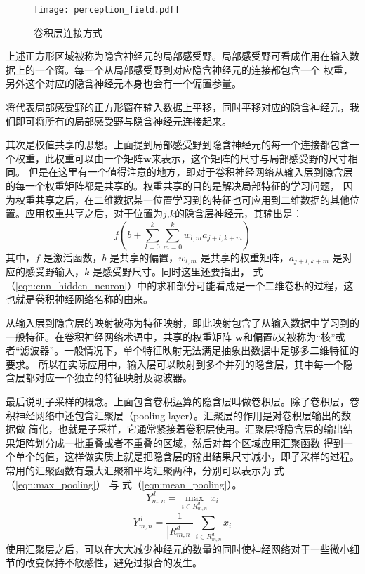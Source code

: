 \begin{figure}[htbp]
	\texttt{[image: perception\_field.pdf]}
	\caption{卷积层连接方式}
	\label{perception_filed}
\end{figure}
上述正方形区域被称为隐含神经元的局部感受野。局部感受野可看成作用在输入数据上的一个窗。每一个从局部感受野到对应隐含神经元的连接都包含一个
权重，另外这个对应的隐含神经元本身也会有一个偏置参量。

将代表局部感受野的正方形窗在输入数据上平移，同时平移对应的隐含神经元，我们即可将所有的局部感受野与隐含神经元连接起来。

其次是权值共享的思想。上面提到局部感受野到隐含神经元的每一个连接都包含一个权重，此权重可以由一个矩阵$\mathbf{w}$来表示，这个矩阵的尺寸与局部感受野的尺寸相同。
但是在这里有一个值得注意的地方，即对于卷积神经网络从输入层到隐含层的每一个权重矩阵都是共享的。权重共享的目的是解决局部特征的学习问题，
因为权重共享之后，在二维数据某一位置学习到的特征也可应用到二维数据的其他位置。应用权重共享之后，对于位置为$j$,$k$的隐含层神经元，其输出是：
\begin{equation} 
\label{eqn:cnn_hidden_neuron}
f\left(b+\sum_{l=0}^{k} \sum_{m=0}^{k} w_{l, m} a_{j+l, k+m}\right)
\end{equation}
其中，$f$ 是激活函数，$b$ 是共享的偏置，$w_{l,m}$ 是共享的权重矩阵，$a_{j+l,k+m}$ 是对应的感受野输入，$k$ 是感受野尺寸。同时这里还要指出，
式（\ref{eqn:cnn_hidden_neuron}）中的求和部分可能看成是一个二维卷积的过程，这也就是卷积神经网络名称的由来。

从输入层到隐含层的映射被称为特征映射，即此映射包含了从输入数据中学习到的一般特征。在卷积神经网络术语中，共享的权重矩阵
$\mathbf{w}$和偏置$b$又被称为“核”或者“滤波器”。一般情况下，单个特征映射无法满足抽象出数据中足够多二维特征的要求。
所以在实际应用中，输入层可以映射到多个并列的隐含层，其中每一个隐含层都对应一个独立的特征映射及滤波器。

最后说明子采样的概念。上面包含卷积运算的隐含层叫做卷积层。除了卷积层，卷积神经网络中还包含汇聚层（pooling layer）。汇聚层的作用是对卷积层输出的数据做
简化，也就是子采样，它通常紧接着卷积层使用。汇聚层将隐含层的输出结果矩阵划分成一批重叠或者不重叠的区域，然后对每个区域应用汇聚函数
得到一个单个的值，这样做实质上就是把隐含层的输出结果尺寸减小，即子采样的过程。常用的汇聚函数有最大汇聚和平均汇聚两种，分别可以表示为
式（\ref{eqn:max_pooling}） 与 式（\ref{eqn:mean_pooling}）。
\begin{equation}
\label{eqn:max_pooling} 
Y_{m, n}^{d}=\max _{i \in R_{m, n}^{d}} x_{i}
\end{equation}
\begin{equation} 
\label{eqn:mean_pooling}
Y_{m, n}^{d}=\frac{1}{\left|R_{m, n}^{d}\right|} \sum_{i \in R_{m, n}^{d}} x_{i}
\end{equation}
使用汇聚层之后，可以在大大减少神经元的数量的同时使神经网络对于一些微小细节的改变保持不敏感性，避免过拟合的发生。

